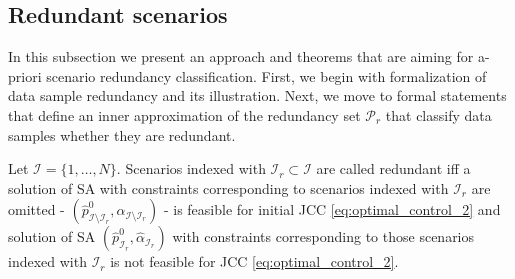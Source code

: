 \subsection{Redundant scenarios}
In this subsection we present an approach and theorems that are aiming for a-priori scenario redundancy classification. First, we begin with formalization of data sample redundancy and its illustration. Next, we move to formal statements that define an inner approximation of the redundancy set $\mathcal{P}_r$ that classify data samples whether they are redundant. 

\begin{definition}
\label{def:redundant}
Let $\mathcal{I} = \{1, \dots, N\}$. Scenarios indexed with $\mathcal{I}_r \subset \mathcal{I}$ are called redundant iff a solution of SA with constraints corresponding to scenarios indexed with $\mathcal{I}_r$ are omitted - $(\hat{p}^0_{\mathcal{I} \setminus \mathcal{I}_r}, \hat{\alpha}_{\mathcal{I} \setminus \mathcal{I}_r})$ - is feasible for initial JCC \eqref{eq:optimal_control_2} and solution of SA $(\hat{p}^0_{\mathcal{I}_r}, \hat{\alpha}_{\mathcal{I}_r})$ with constraints corresponding to those scenarios indexed with $\mathcal{I}_r$ is not feasible for JCC \eqref{eq:optimal_control_2}.
\end{definition}

